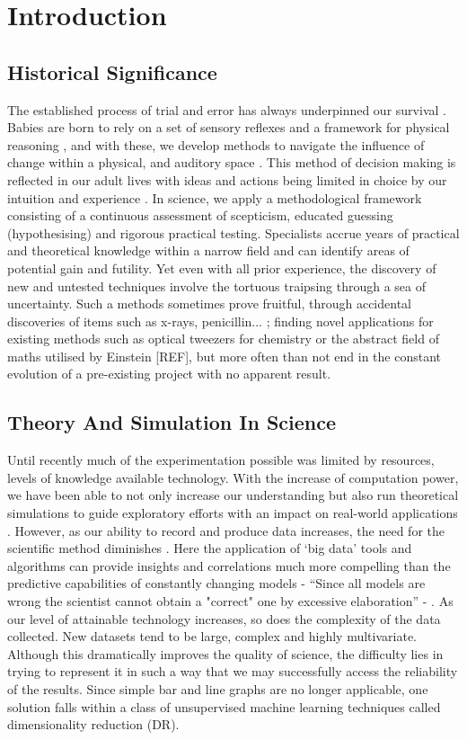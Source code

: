 
\section{Introduction}

\subsection*{Historical Significance}
The established process of trial and error has always underpinned our survival \citep{TrialandError}. Babies are born to rely on a set of sensory reflexes and a framework for physical reasoning \citep{pr}, and with these, we develop methods to navigate the influence of change within a physical, and auditory space \citep{objects}. This method of decision making is reflected in our adult lives with ideas and actions being limited in choice by our intuition and experience \citep{descartes}. In science, we apply a methodological framework consisting of a continuous assessment of scepticism, educated guessing (hypothesising) and rigorous practical testing. Specialists accrue years of practical and theoretical knowledge within a narrow field and can identify areas of potential gain and futility. Yet even with all prior experience, the discovery of new and untested techniques involve the tortuous traipsing through a sea of uncertainty. Such a methods sometimes prove fruitful, through accidental discoveries of items such as x-rays, penicillin... \citep{accidental}; finding novel applications for existing methods such as optical tweezers for chemistry or the abstract field of maths utilised by Einstein [REF], but more often than not end in the constant evolution of a pre-existing project with no apparent result.

\subsection*{Theory And Simulation In Science}

Until recently much of the experimentation possible was limited by resources, levels of knowledge available technology. With the increase of computation power, we have been able to not only increase our understanding but also run theoretical simulations to guide exploratory efforts with an impact on real-world applications \citep{dft,lion,theoreticalbio,drug}. However, as our ability to record and produce data increases, the need for the scientific method diminishes \citep{wired}. Here the application of `big data' tools and algorithms can provide insights and correlations much more compelling than the predictive capabilities of constantly changing models - ``Since all models are wrong the scientist cannot obtain
a "correct" one by excessive elaboration'' - \cite{allmodels}. As our level of attainable technology increases, so does the complexity of the data collected. New datasets tend to be large, complex and highly multivariate. Although this dramatically improves the quality of science, the difficulty lies in trying to represent it in such a way that we may successfully access the reliability of the results. Since simple bar and line graphs are no longer applicable, one solution falls within a class of unsupervised machine learning techniques called dimensionality reduction (DR).


